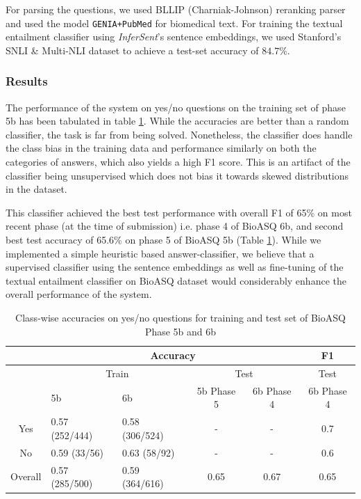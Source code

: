 For parsing the questions, we used BLLIP (Charniak-Johnson) reranking parser \cite{charniak_new1}
and used the model \texttt{GENIA+PubMed} for biomedical text. For training the textual entailment classifier using \textit{InferSent}'s sentence embeddings, we used Stanford's SNLI \& Multi-NLI dataset \cite{snli} to achieve a test-set accuracy of $84.7 \%$.

\subsubsection{Results}

The performance of the system on yes/no questions on the training set of phase 5b has been tabulated in table \ref{tab:yesno_results}. While the accuracies are better than a random classifier, the task is far from being solved. Nonetheless, the classifier does handle the class bias in the training data and performance similarly on both the categories of answers, which also yields a high F1 score. This is an artifact of the classifier being unsupervised which does not bias it towards skewed distributions in the dataset.

This classifier achieved the best test performance with overall F1 of 65\% on most recent phase (at the time of submission) i.e. phase 4 of BioASQ 6b, and second best test accuracy of 65.6\% on phase 5 of BioASQ 5b (Table \ref{tab:yesno_results}). While we implemented a simple heuristic based answer-classifier, we believe that a supervised classifier using the sentence embeddings as well as fine-tuning of the textual entailment classifier on BioASQ dataset would considerably enhance the overall performance of the system.

\begin{table}[h]
    \centering
    \begin{tabular}{| c | l | l | c | c | c |} \hline
    & \multicolumn{4}{c|}{Accuracy} & \multicolumn{1}{c|}{F1} \\ \hline
    & \multicolumn{2}{c|}{Train} & \multicolumn{2}{c|}{Test} & \multicolumn{1}{c|}{Test} \\ \hline
    & 5b          & 6b &             5b  Phase 5 &          6b Phase 4 & 6b Phase 4 \\ \hline
    Yes         & 0.57 (252/444)  & 0.58 (306/524)     &  -           & -           & 0.7   \\
No          & 0.59 (33/56)    & 0.63 (58/92)       &  -           & -           & 0.6   \\
Overall     & 0.57 (285/500)  & 0.59 (364/616)     &  0.65        & 0.67        & 0.65  \\ \hline
\end{tabular}
    \caption{Class-wise accuracies on yes/no questions for training and test set of BioASQ Phase 5b and 6b}
    \label{tab:yesno_results}
\end{table}

